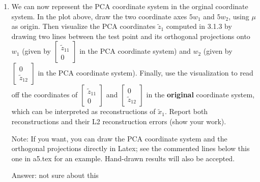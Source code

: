 \documentclass{article}
\def\ans#1{\par\gre{Answer: #1}}
\def\blu#1{{\color{blu}#1}}
\def\gre#1{{\color{gre}#1}}
\begin{document}
\begin{enumerate}
  \pagebreak
  \item We can now represent the PCA coordinate system in the orginal coordinate system. \blu{In the plot above, draw the two coordinate axes $5w_1$ and $5w_2$, using $\mu$ as origin. Then visualize the PCA coordinates $\tilde{z}_1$ computed in 3.1.3 by drawing two lines between the test point and its orthogonal projections onto $w_1$ (given by $\begin{bmatrix} \tilde{z}_{11} \\ 0 \end{bmatrix}$ in the PCA coordinate system) and $w_2$ (given by $\begin{bmatrix} 0 \\ \tilde{z}_{12} \end{bmatrix}$ in the PCA coordinate system). Finally, use the visualization to read off the coordinates of $\begin{bmatrix} \tilde{z}_{11} \\ 0 \end{bmatrix}$ and $\begin{bmatrix} 0 \\ \tilde{z}_{12} \end{bmatrix}$ in the {\bf original} coordinate system, which can be interpreted as reconstructions of $\tilde{x}_1$. Report both reconstructions and their L2 reconstruction errors (show your work).}
  
   Note: If you want, you can draw the PCA coordinate system and the orthogonal projections directly in Latex; see the commented lines below this one in a5.tex for an example. Hand-drawn results will also be accepted.

\ans{not sure about this}
   


\end{enumerate}
\pagebreak
\end{document}
